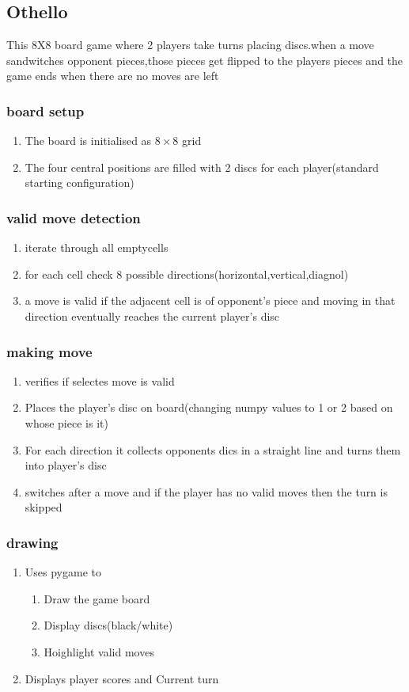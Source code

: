\documentclass{article}
\begin{document}
\subsection{Othello}
This 8X8 board game where 2 players take turns placing discs.when a move sandwitches opponent pieces,those pieces get flipped to the players pieces and the game ends when there are no moves are left
\subsubsection{board setup}
\begin{enumerate}
    \item The board is initialised as $8 \times 8$ grid
    \item The four central positions are filled with 2 discs for each player(standard starting configuration)
\end{enumerate}
\subsubsection{valid move detection}
\begin{enumerate}
    \item iterate through all emptycells
    \item for each cell check 8 possible directions(horizontal,vertical,diagnol)
    \item a move is valid if the adjacent cell is of opponent's piece and moving in that direction eventually reaches the current player's disc
\end{enumerate}
\subsubsection{making move}
\begin{enumerate}
    \item verifies if selectes move is valid
    \item Places the player's disc on board(changing numpy values to 1 or 2 based on whose piece is it)
    \item For each direction it collects opponents dics in a straight line and turns them into player's disc
    \item switches after a move and if the player has no valid moves then the turn is skipped
\end{enumerate}
\subsubsection{drawing}
\begin{enumerate}
    \item Uses pygame to\begin{enumerate}
        \item Draw the game board
        \item Display discs(black/white)
        \item Hoighlight valid moves
    \end{enumerate}
    \item Displays player scores and Current turn
\end{enumerate}
\end{document}
